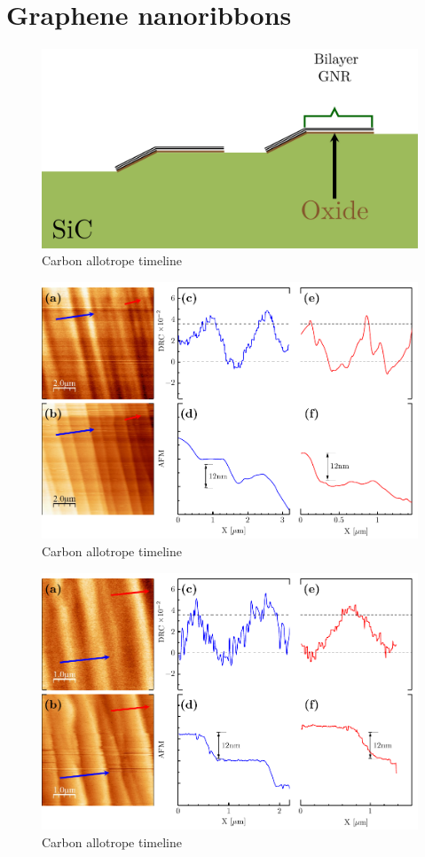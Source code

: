 \section{Graphene nanoribbons}
\begin{figure}
	\centering
	\includegraphics[width=1\linewidth]{FIGURES/Experimental_results/GA.pdf}
	\caption{Carbon allotrope timeline}
	\label{fig:introfig32}
\end{figure}



\begin{figure}
	\centering
	\includegraphics[width=0.75\linewidth]{FIGURES/Experimental_results/FG163R.pdf}
	\caption{Carbon allotrope timeline}
	\label{fig:FG163R}
\end{figure}


\begin{figure}
	\centering
	\includegraphics[width=0.75\linewidth]{FIGURES/Experimental_results/FG163R-01.pdf}
	\caption{Carbon allotrope timeline}
	\label{fig:FG163R-01}
\end{figure}


